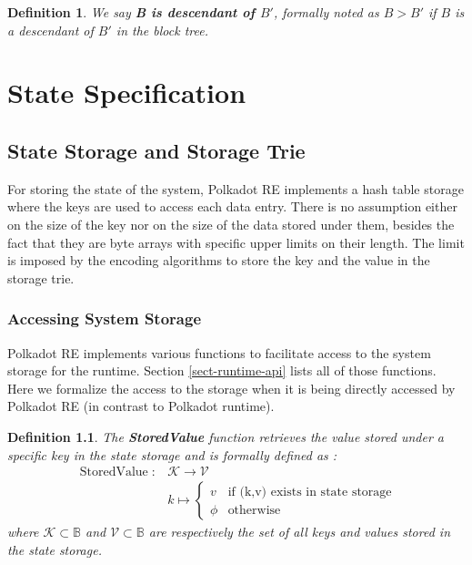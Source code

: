 \documentclass{book}
\newcommand{\tmop}[1]{\ensuremath{\operatorname{#1}}}
\newcommand{\tmstrong}[1]{\textbf{#1}}
\newtheorem{definition}{Definition}
\newtheorem{definition}{Definition}
\begin{document}
\begin{definition}
  We say {\tmstrong{B is descendant of $B'$}}, formally noted as {\tmstrong{$B
  > B'$}} if $B$ is a descendant of $B'$ in the block tree.
\end{definition}

\chapter{State Specification}\label{chap-state-spec}

\section{State Storage and Storage Trie}

For storing the state of the system, Polkadot RE implements a hash table
storage where the keys are used to access each data entry. There is no
assumption either on the size of the key nor on the size of the data stored
under them, besides the fact that they are byte arrays with specific upper
limits on their length. The limit is imposed by the encoding algorithms to
store the key and the value in the storage trie.

\subsection{Accessing System Storage }

Polkadot RE implements various functions to facilitate access to the system
storage for the runtime. Section \ref{sect-runtime-api} lists all of those
functions. Here we formalize the access to the storage when it is being
directly accessed by Polkadot RE (in contrast to Polkadot runtime).

\begin{definition}
  \label{defn-stored-value}The {\tmstrong{StoredValue}} function retrieves the
  value stored under a specific key in the state storage and is formally
  defined as :
  \[ \begin{array}{cc}
       \tmop{StoredValue} : & \mathcal{K} \rightarrow \mathcal{V}\\
       & k \mapsto \left\{ \begin{array}{cc}
         v & \text{if (k,v) exists in state storage}\\
         \phi & \tmop{otherwise}
       \end{array} \right.
     \end{array} \]
  where $\mathcal{K} \subset \mathbb{B}$ and $\mathcal{V} \subset \mathbb{B}$
  are respectively the set of all keys and values stored in the state storage.
  
  \ 
\end{definition}
\end{document}
